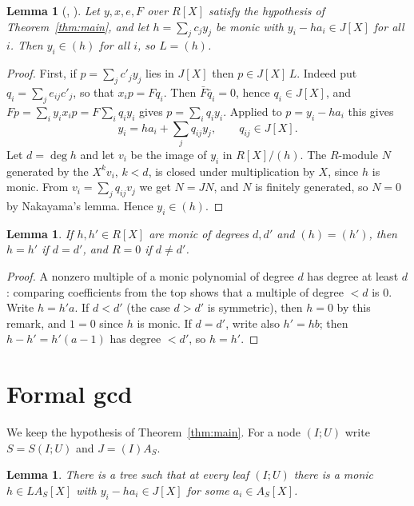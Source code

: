 \documentclass[11pt]{amsart}
\newtheorem{lemma}[theorem]{Lemma}
\theoremstyle{remark}
\begin{document}
\begin{lemma}[{\cite[IV.5.2]{Lam06}, \cite[Lemma 7.6]{Proj}}]\label{lem:local}
Let $y,x,e,F$ over $R[X]$ satisfy the hypothesis of Theorem~\ref{thm:main}, and
let $h=\sum_jc_jy_j$ be monic with $y_i-ha_i\in J[X]$ for all $i$. Then
$y_i\in(h)$ for all $i$, so $L=(h)$.
\end{lemma}

\begin{proof}
First, if $p=\sum_j c'_jy_j$ lies in $J[X]$ then $p\in J[X]\,L$. Indeed put
$q_i=\sum_je_{ij}c'_j$, so that $x_ip=Fq_i$. Then $\bar F\bar q_i=0$, hence
$q_i\in J[X]$, and $Fp=\sum_iy_ix_ip=F\sum_iq_iy_i$ gives $p=\sum_iq_iy_i$.
Applied to $p=y_i-ha_i$ this gives
\[
y_i = ha_i + \textstyle\sum_jq_{ij}y_j,\qquad q_{ij}\in J[X].
\]
Let $d=\deg h$ and let $v_i$ be the image of $y_i$ in $R[X]/(h)$. The
$R$-module $N$ generated by the $X^kv_i$, $k<d$, is closed under
multiplication by $X$, since $h$ is monic. From $v_i=\sum_jq_{ij}v_j$ we get
$N=JN$, and $N$ is finitely generated, so $N=0$ by Nakayama's lemma. Hence
$y_i\in(h)$.
\end{proof}

\begin{lemma}\label{lem:unique}
If $h,h'\in R[X]$ are monic of degrees $d,d'$ and $(h)=(h')$, then $h=h'$ if
$d=d'$, and $R=0$ if $d\ne d'$.
\end{lemma}

\begin{proof}
A nonzero multiple of a monic polynomial of degree $d$ has degree at least $d$:
comparing coefficients from the top shows that a multiple of degree $<d$ is $0$.
Write $h=h'a$. If $d<d'$ (the case $d>d'$ is symmetric), then $h=0$ by this remark, and $1=0$ since $h$ is
monic. If $d=d'$, write also $h'=hb$; then $h-h'=h'(a-1)$ has degree $<d'$,
so $h=h'$.
\end{proof}

\section{Formal gcd}

We keep the hypothesis of Theorem~\ref{thm:main}. For a node $(I;U)$ write
$S=S(I;U)$ and $J=(I)A_S$.

\begin{lemma}\label{lem:tree}
There is a tree such that at every leaf $(I;U)$ there is a monic $h\in L A_S[X]$
with $y_i-ha_i\in J[X]$ for some $a_i\in A_S[X]$.
\end{lemma}
\end{document}

